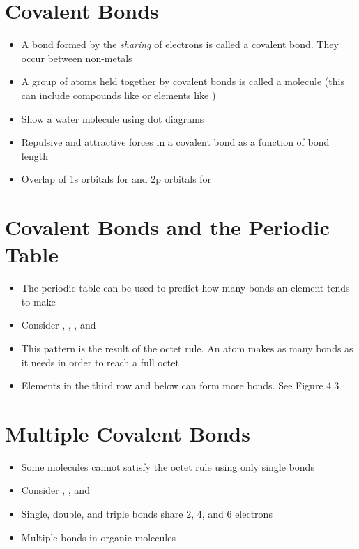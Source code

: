 \documentclass[12pt, openany, letterpaper]{memoir}
\begin{document}
\section{Covalent Bonds}
\begin{itemize}
	\item A bond formed by the \emph{sharing} of electrons is called a covalent bond. They occur between non-metals
	\item A group of atoms held together by covalent bonds is called a molecule (this can include compounds like  or elements like )
	\item Show a water molecule using dot diagrams
	\item Repulsive and attractive forces in a covalent bond as a function of bond length
	\item Overlap of 1s orbitals for  and 2p orbitals for 
\end{itemize}
\section{Covalent Bonds and the Periodic Table}
\begin{itemize}
	\item The periodic table can be used to predict how many bonds an element tends to make
	\item Consider , , , and 
	\item This pattern is the result of the octet rule. An atom makes as many bonds as it needs in order to reach a full octet
	\item Elements in the third row and below can form more bonds. See Figure 4.3
\end{itemize}
\section{Multiple Covalent Bonds}
\begin{itemize}
	\item Some molecules cannot satisfy the octet rule using only single bonds
	\item Consider , , and 
	\item Single, double, and triple bonds share 2, 4, and 6 electrons
	\item Multiple bonds in organic molecules
\end{itemize}
\end{document}

